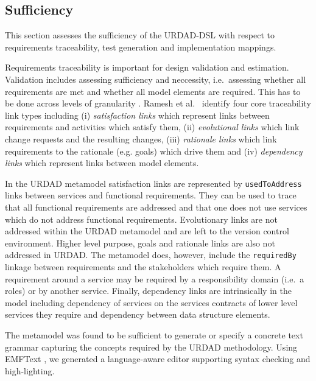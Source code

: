 \subsection{Sufficiency}

This section assesses the sufficiency of the URDAD-DSL with respect to requirements traceability, test generation and implementation mappings. 

Requirements traceability is important for design validation and estimation. Validation includes assessing sufficiency and neccessity, i.e.\ assessing whether all requirements are met and whether all model elements are required. This has to be done across levels of granularity \cite{dick_design_2005}. Ramesh et al.\ \cite{ramesh_toward_2001} identify four core traceability link types including (i) \emph{satisfaction links} which represent links between requirements and activities which satisfy them, (ii) \emph{evolutional links} which link change requests and the resulting changes, (iii) \emph{rationale links} which link requirements to the rationale (e.g. goals) which drive them and (iv) \emph{dependency links} which represent links between model elements.

In the URDAD metamodel satisfaction links are represented by \verb+usedToAddress+ links between services and functional requirements. They can be used to trace that all functional requirements are addressed and that one does not use services which do not address functional requirements. Evolutionary links are not addressed within the URDAD metamodel and are left to the version control environment. Higher level purpose, goals and rationale links are also not addressed in URDAD. The metamodel does, however, include the \verb+requiredBy+ linkage between requirements and the stakeholders which require them. A requirement around a service may be required by a responsibility domain (i.e.\ a roles) or by another service. Finally, dependency links are intrinsically in the model including  dependency of services on the services contracts of lower level services they require and dependency between data structure elements. 

The metamodel was found to be sufficient to generate or specify a concrete text grammar capturing the concepts required by the URDAD methodology. Using EMFText \cite{heidenreich_derivation_2009}, we generated a language-aware editor supporting syntax checking and high-lighting.

